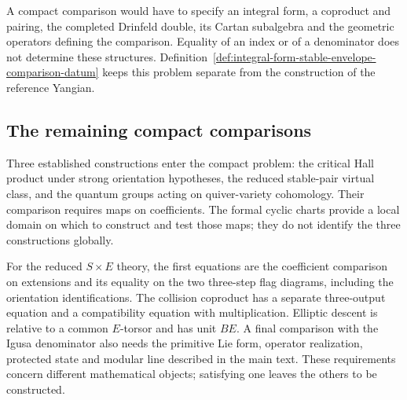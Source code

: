 A compact comparison would have to specify an integral form, a
coproduct and pairing, the completed Drinfeld double, its Cartan
subalgebra and the geometric operators defining the comparison.
Equality of an index or of a denominator does not determine these
structures. Definition~\ref{def:integral-form-stable-envelope-comparison-datum}
keeps this problem separate from the construction of the reference
Yangian.

\subsection{The remaining compact comparisons}
\label{app:hall-level-separations}
\label{app:hall-local-obstruction-calculations}

Three established constructions enter the compact problem: the
critical Hall product under strong orientation hypotheses, the
reduced stable-pair virtual class, and the quantum groups acting on
quiver-variety cohomology. Their comparison requires maps on
coefficients. The formal cyclic charts provide a local domain on
which to construct and test those maps; they do not identify the
three constructions globally.

For the reduced $S\times E$ theory, the first equations are the
coefficient comparison on extensions and its equality on the two
three-step flag diagrams, including the orientation identifications.
The collision coproduct has a separate three-output equation and a
compatibility equation with multiplication. Elliptic descent is
relative to a common $E$-torsor and has unit $BE$. A final comparison
with the Igusa denominator also needs the primitive Lie form,
operator realization, protected state and modular line described in
the main text. These requirements concern different mathematical
objects; satisfying one leaves the others to be constructed.
